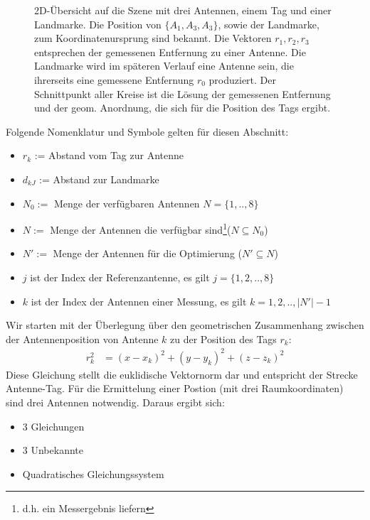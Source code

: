 \begin{figure}
	\begin{center}
		\caption[Antennen-Szene mit einem Tag]{2D-Übersicht auf die Szene mit drei Antennen, einem Tag und einer Landmarke. Die Position von $\{A_1,A_3,A_3\}$, sowie der Landmarke, zum Koordinatenursprung sind bekannt.
Die Vektoren $r_1,r_2,r_3$ entsprechen der gemessenen Entfernung zu einer Antenne.
Die Landmarke wird im späteren Verlauf eine Antenne sein, die ihrerseits eine gemessene Entfernung $r_0$ produziert.
Der Schnittpunkt aller Kreise ist die Lösung der gemessenen Entfernung und der geom. Anordnung, die sich für die Position des Tags ergibt.
} 
		\label{fig:TrilaterationScene}
		
%		
	\end{center}
\end{figure}
%
Folgende Nomenklatur und Symbole gelten für diesen Abschnitt:
\begin{itemize}[itemsep=0mm]
	\item	$r_{k}$ := Abstand vom Tag zur Antenne
	\item	$d_{kJ}$ := Abstand zur Landmarke
	\item	$N_0:=$ Menge der verfügbaren Antennen $N=\{1,..,8\}$
	\item	$N:=$ Menge der Antennen die verfügbar sind\footnote{d.h. ein Messergebnis liefern}($N \subseteq N_0$)
	\item	$N':=$ Menge der Antennen für die Optimierung ($N' \subseteq N$)
	\item	$j$ ist der Index der Referenzantenne, es gilt $j = \{1,2,..,8\}$
	\item	$k$ ist der Index der Antennen einer Messung, es gilt $k = 1,2,..,|N'|-1$
\end{itemize}
%
Wir starten mit der Überlegung über den geometrischen Zusammenhang zwischen der Antennenposition von Antenne $k$ zu der Position des Tags $r_k$:
\begin{align}
	\label{eq:base_vactor}
	r_{k}^2 &= (x-x_k)^2+(y-y_k)^2+(z-z_k)^2
\end{align}
%
Diese Gleichung stellt die euklidische Vektornorm dar und entspricht der Strecke Antenne-Tag. Für die Ermittelung einer Postion (mit drei Raumkoordinaten) sind drei Antennen notwendig. Daraus ergibt sich:
%
\begin{itemize}[itemsep=0mm]
\item 3 Gleichungen
\item 3 Unbekannte
\item Quadratisches Gleichungssystem
\end{itemize}
